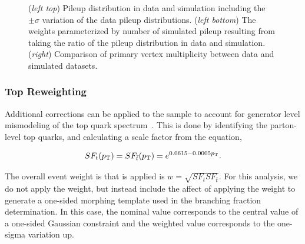 \begin{figure}[ht]
    \caption{(\emph{left top}) Pileup distribution in data and simulation including the $\pm\sigma$ variation of the data pileup distributions. (\emph{left bottom}) The weights parameterized by number of simulated pileup resulting from taking the ratio of the pileup distribution in data and simulation. (\emph{right}) Comparison of primary vertex multiplicity between data and simulated datasets. }
    \label{fig:analysis:dataset:pileup}
\end{figure}

    
\FloatBarrier


\subsubsection{Top \pt Reweighting}

Additional corrections can be applied to the \ttbar sample to account for generator level mismodeling of the top quark \pt spectrum~\cite{CMS-PAS-TOP-16-011, CMS-PAS-TOP-16-008}.  This is done by identifying the parton-level top quarks, and calculating a scale factor from the equation,

\begin{equation}
    \nonumber
    SF_{t}(p_{\mathrm{T}}) = SF_{\bar{t}}(p_{\mathrm{T}}) = e^{0.0615-0.0005 p_{\mathrm{T}}}.
\end{equation}


The overall event weight is that is applied is $w = \sqrt{SF_{t}SF_{\bar{t}}}$.  For this analysis, we do not apply the weight, but instead include the affect of applying the weight to generate a one-sided morphing template used in the branching fraction determination.  In this case, the nominal value corresponds to the central value of a one-sided Gaussian constraint and the weighted value corresponds to the one-sigma variation up.

